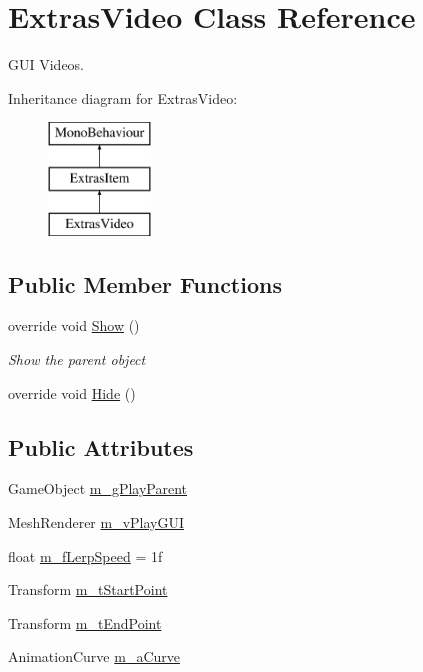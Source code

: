 \hypertarget{class_extras_video}{}\section{Extras\+Video Class Reference}
\label{class_extras_video}


G\+UI Videos.  


Inheritance diagram for Extras\+Video\+:\begin{figure}[H]
\begin{center}
\leavevmode
\includegraphics[height=3.000000cm]{class_extras_video}
\end{center}
\end{figure}
\subsection*{Public Member Functions}
\begin{DoxyCompactItemize}
\item 
override void \mbox{\hyperlink{class_extras_video_a3391788cf3302c1d3dc6eaf4223ea94c}{Show}} ()
\begin{DoxyCompactList}\small\item\em Show the parent object \end{DoxyCompactList}\item 
override void \mbox{\hyperlink{class_extras_video_a546c420f0653ab38b223e6bb11e805ee}{Hide}} ()
\end{DoxyCompactItemize}
\subsection*{Public Attributes}
\begin{DoxyCompactItemize}
\item 
Game\+Object \mbox{\hyperlink{class_extras_video_ac1f393227f94c6cdb17d1ec7251612e6}{m\+\_\+g\+Play\+Parent}}
\item 
Mesh\+Renderer \mbox{\hyperlink{class_extras_video_a819bd3f57c903a2019b9f21348696ac2}{m\+\_\+v\+Play\+G\+UI}}
\item 
float \mbox{\hyperlink{class_extras_video_af9d3dbc74b587f8dd37ec37e1bceae79}{m\+\_\+f\+Lerp\+Speed}} = 1f
\item 
Transform \mbox{\hyperlink{class_extras_video_adabea3ddcfe31ffa308c5e5e4a32ede8}{m\+\_\+t\+Start\+Point}}
\item 
Transform \mbox{\hyperlink{class_extras_video_a417b4f2d57cc32fd27178cf3bb0b41c3}{m\+\_\+t\+End\+Point}}
\item 
Animation\+Curve \mbox{\hyperlink{class_extras_video_ab6157f0e96d9bfadfc83a222eadd80e1}{m\+\_\+a\+Curve}}
\end{DoxyCompactItemize}
